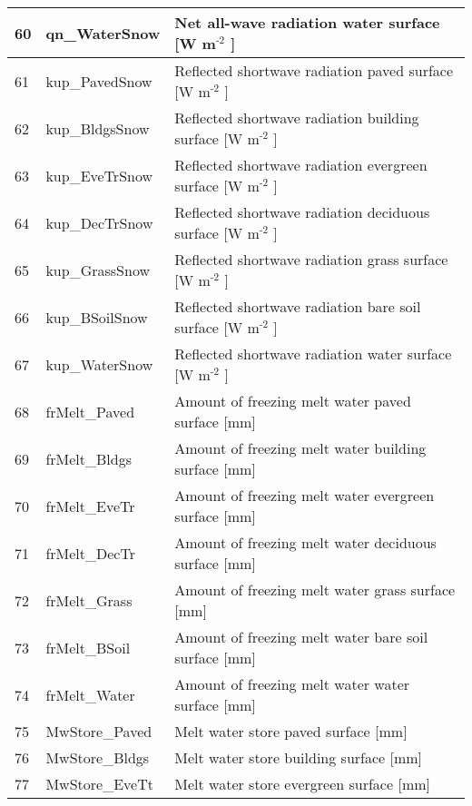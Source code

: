 \documentclass[letterpaper,10pt,english]{sphinxmanual}
\begin{document}
\begin{savenotes}
\begin{longtable}{|l|l|l|}
\hline
60
&
qn\_WaterSnow
&
Net all-wave radiation \textendash{} water surface {[}W m$^{\text{-2}}$ {]}
\\
\hline
61
&
kup\_PavedSnow
&
Reflected shortwave radiation \textendash{} paved surface {[}W m$^{\text{-2}}$ {]}
\\
\hline
62
&
kup\_BldgsSnow
&
Reflected shortwave radiation \textendash{} building surface {[}W m$^{\text{-2}}$ {]}
\\
\hline
63
&
kup\_EveTrSnow
&
Reflected shortwave radiation \textendash{} evergreen surface {[}W m$^{\text{-2}}$ {]}
\\
\hline
64
&
kup\_DecTrSnow
&
Reflected shortwave radiation \textendash{} deciduous surface {[}W m$^{\text{-2}}$ {]}
\\
\hline
65
&
kup\_GrassSnow
&
Reflected shortwave radiation \textendash{} grass surface {[}W m$^{\text{-2}}$ {]}
\\
\hline
66
&
kup\_BSoilSnow
&
Reflected shortwave radiation \textendash{} bare soil surface {[}W m$^{\text{-2}}$ {]}
\\
\hline
67
&
kup\_WaterSnow
&
Reflected shortwave radiation \textendash{} water surface {[}W m$^{\text{-2}}$ {]}
\\
\hline
68
&
frMelt\_Paved
&
Amount of freezing melt water \textendash{} paved surface {[}mm{]}
\\
\hline
69
&
frMelt\_Bldgs
&
Amount of freezing melt water \textendash{} building surface {[}mm{]}
\\
\hline
70
&
frMelt\_EveTr
&
Amount of freezing melt water \textendash{} evergreen surface {[}mm{]}
\\
\hline
71
&
frMelt\_DecTr
&
Amount of freezing melt water \textendash{} deciduous surface {[}mm{]}
\\
\hline
72
&
frMelt\_Grass
&
Amount of freezing melt water \textendash{} grass surface {[}mm{]}
\\
\hline
73
&
frMelt\_BSoil
&
Amount of freezing melt water \textendash{} bare soil surface {[}mm{]}
\\
\hline
74
&
frMelt\_Water
&
Amount of freezing melt water \textendash{} water surface {[}mm{]}
\\
\hline
75
&
MwStore\_Paved
&
Melt water store \textendash{} paved surface {[}mm{]}
\\
\hline
76
&
MwStore\_Bldgs
&
Melt water store \textendash{} building surface {[}mm{]}
\\
\hline
77
&
MwStore\_EveTt
&
Melt water store \textendash{} evergreen surface {[}mm{]}
\\

\end{longtable}
\end{savenotes}
\end{document}
